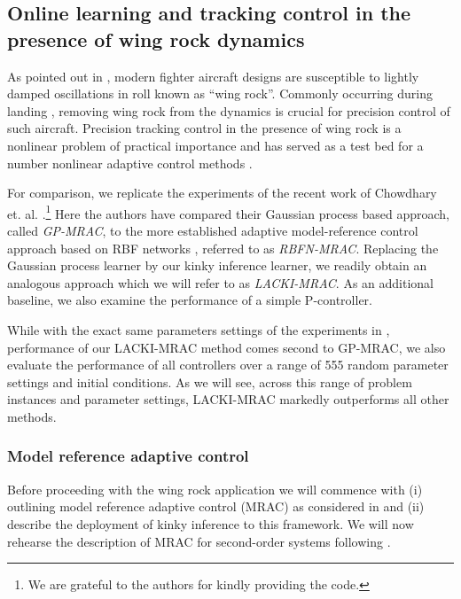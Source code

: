 \documentclass{article} %
\theoremstyle{definition}
\theoremstyle{remark}
\begin{document}
\subsection{Online learning and tracking control in the presence of wing rock dynamics }
\label{sec:KIMRAC}
As pointed out in \cite{chowdharyacc2013}, modern fighter aircraft designs are susceptible to lightly damped oscillations in roll known as ``wing rock''. Commonly occurring during landing \cite{Saad2000}, removing wing rock from the dynamics is crucial for precision control of such aircraft.
Precision tracking control in the presence of wing rock is a nonlinear problem of practical importance and has served as a test bed for a number nonlinear adaptive control methods \cite{Chowdhary2013,Monahemi1996,chowdharyacc2013}.

For comparison, we replicate the experiments of the recent work of Chowdhary et. al. \cite{Chowdhary2013,ChowdharyCDC2013}.\footnote{We are grateful to the authors for kindly providing the code.}
Here the authors have compared their Gaussian process based approach, called \textit{GP-MRAC}, to the more established adaptive model-reference control approach based on RBF networks \cite{Sanner1992,Kim1998}, referred to as \textit{RBFN-MRAC}. Replacing the Gaussian process learner by our kinky inference learner, we readily obtain an analogous approach which we will refer to as \textit{LACKI-MRAC}. As an additional baseline, we also examine the performance of a simple P-controller.

While with the exact same parameters settings of the experiments in \cite{Chowdhary2013}, performance of our LACKI-MRAC method comes second to GP-MRAC, we also evaluate the performance of all controllers over a range of 555 random parameter settings and initial conditions. As we will see, across this range of problem instances and parameter settings, LACKI-MRAC markedly outperforms all other methods.

\subsubsection{Model reference adaptive control}\label{sec:mrac}
Before proceeding with the wing rock application we will commence with (i) outlining model reference adaptive control (MRAC) \cite{astroemadaptivectrlbook2013} as considered in \cite{Chowdhary2013} and (ii) describe the deployment of kinky inference to this framework. 
We will now rehearse the description of MRAC for second-order systems following \cite{Chowdhary2013}. 
\end{document}
